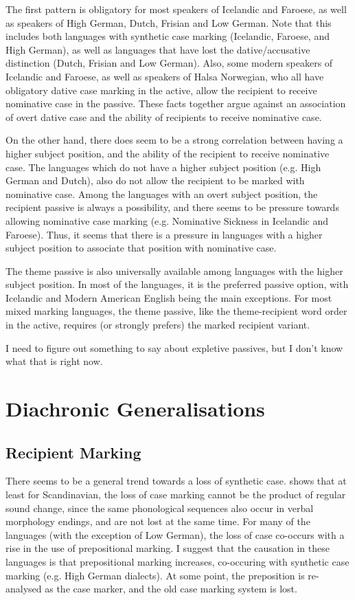 The first pattern is obligatory for most speakers of Icelandic and Faroese, as well as speakers of High German, Dutch, Frisian and Low German. Note that this includes both languages with synthetic case marking (Icelandic, Faroese, and High German), as well as languages that have lost the dative/accusative distinction (Dutch, Frisian and Low German). Also, some modern speakers of Icelandic and Faroese, as well as speakers of Halsa Norwegian, who all have obligatory dative case marking in the active, allow the recipient to receive nominative case in the passive. These facts together argue against an association of overt dative case and the ability of recipients to receive nominative case.

On the other hand, there does seem to be a strong correlation between having a higher subject position, and the ability of the recipient to receive nominative case. The languages which do not have a higher subject position (e.g. High German and Dutch), also do not allow the recipient to be marked with nominative case. Among the languages with an overt subject position, the recipient passive is always a possibility, and there seems to be pressure towards allowing nominative case marking (e.g. Nominative Sickness in Icelandic and Faroese). Thus, it seems that there is a pressure in languages with a higher subject position to associate that position with nominative case.

The theme passive is also universally available among languages with the higher subject position. In most of the languages, it is the preferred passive option, with Icelandic and Modern American English being the main exceptions. For most mixed marking languages, the theme passive, like the theme-recipient word order in the active, requires (or strongly prefers) the marked recipient variant.

I need to figure out something to say about expletive passives, but I don't know what that is right now.
\chapter{Diachronic Generalisations}\label{chap:diagen}
\section{Recipient Marking}
There seems to be a general trend towards a loss of synthetic case. \cite{Bardal.2009} shows that at least for Scandinavian, the loss of case marking cannot be the product of regular sound change, since the same phonological sequences also occur in verbal morphology endings, and are not lost at the same time. For many of the languages (with the exception of Low German), the loss of case co-occurs with a rise in the use of prepositional marking. I suggest that the causation in these languages is that prepositional marking increases, co-occuring with synthetic case marking (e.g. High German dialects). At some point, the preposition is re-analysed as the case marker, and the old case marking system is lost.
